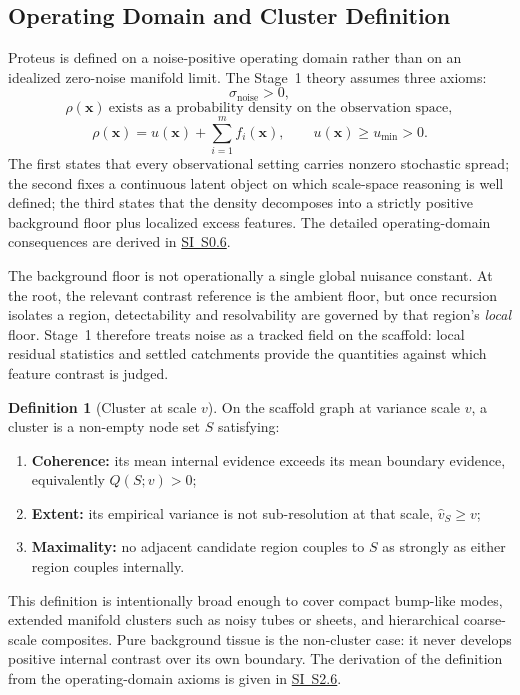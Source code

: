 \documentclass[11pt]{article}
\theoremstyle{definition}
\newtheorem{definition}{Definition}[section]
\theoremstyle{plain}
\begin{document}
\subsection{Operating Domain and Cluster Definition}
Proteus is defined on a noise-positive operating domain rather than on an idealized zero-noise manifold limit. The Stage~1 theory assumes three axioms:
\[
\sigma_{\mathrm{noise}} > 0,
\]
\[
\rho(\mathbf x)\ \text{exists as a probability density on the observation space},
\]
\[
\rho(\mathbf x)=u(\mathbf x)+\sum_{i=1}^m f_i(\mathbf x),
\qquad
u(\mathbf x)\ge u_{\min}>0.
\]
The first states that every observational setting carries nonzero stochastic spread; the second fixes a continuous latent object on which scale-space reasoning is well defined; the third states that the density decomposes into a strictly positive background floor plus localized excess features. The detailed operating-domain consequences are derived in \hyperref[sec:si-noise-floor]{SI~S0.6}.

The background floor is not operationally a single global nuisance constant. At the root, the relevant contrast reference is the ambient floor, but once recursion isolates a region, detectability and resolvability are governed by that region's \emph{local} floor. Stage~1 therefore treats noise as a tracked field on the scaffold: local residual statistics and settled catchments provide the quantities against which feature contrast is judged.

\begin{definition}[Cluster at scale $v$]
On the scaffold graph at variance scale $v$, a cluster is a non-empty node set $S$ satisfying:
\begin{enumerate}[leftmargin=1.5em]
    \item \textbf{Coherence:} its mean internal evidence exceeds its mean boundary evidence, equivalently $Q(S;v)>0$;
    \item \textbf{Extent:} its empirical variance is not sub-resolution at that scale, $\hat v_S\ge v$;
    \item \textbf{Maximality:} no adjacent candidate region couples to $S$ as strongly as either region couples internally.
\end{enumerate}
\end{definition}

This definition is intentionally broad enough to cover compact bump-like modes, extended manifold clusters such as noisy tubes or sheets, and hierarchical coarse-scale composites. Pure background tissue is the non-cluster case: it never develops positive internal contrast over its own boundary. The derivation of the definition from the operating-domain axioms is given in \hyperref[sec:si-cluster-derivation]{SI~S2.6}.
\end{document}
